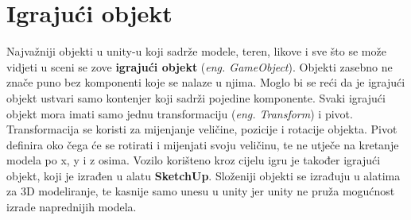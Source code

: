 \section{Igrajući objekt}
Najvažniji objekti u unity-u koji sadrže modele, teren, likove i sve što se može vidjeti u sceni se zove \textbf{igrajući objekt} (\emph{eng. GameObject}). Objekti zasebno ne znače puno bez komponenti koje se nalaze u njima. Moglo bi se reći da je igrajući objekt ustvari samo kontenjer koji sadrži pojedine komponente. Svaki igrajući objekt mora imati samo jednu transformaciju (\emph{eng. Transform}) i pivot. Transformacija se koristi za mijenjanje veličine, pozicije i rotacije objekta. Pivot definira oko čega će se rotirati i mijenjati svoju veličinu, te ne utječe na kretanje modela po x, y i z osima.
\vspace{2mm}
\newline Vozilo korišteno kroz cijelu igru je također igrajući objekt, koji je izrađen u alatu \textbf{SketchUp}. Složeniji objekti se izrađuju u alatima za 3D modeliranje, te kasnije samo unesu u unity jer unity ne pruža mogućnost izrade naprednijih modela. 

